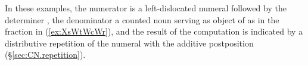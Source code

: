 In these examples, the numerator is a left-dislocated numeral followed by the determiner , the denominator a counted noun serving as object of  as in the fraction in (\ref{ex:XsWtWcWr}), and the result of the computation is indicated by a distributive repetition of the numeral with the additive postposition  (§\ref{sec:CN.repetition}).
 
